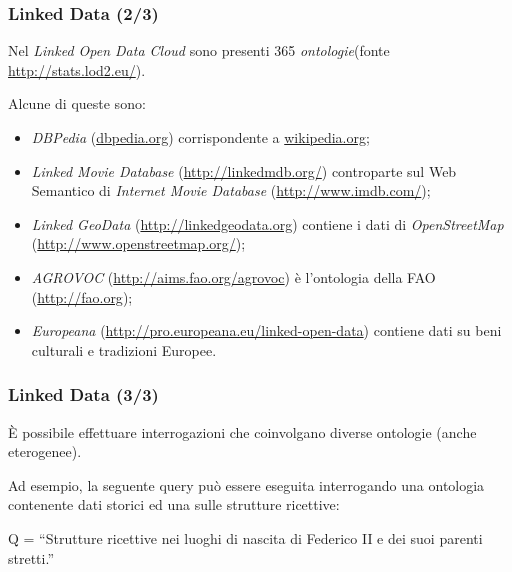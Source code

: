 \documentclass[8pt]{beamer}
\begin{document}
\begin{frame}
\frametitle{Linked Data (2/3)}
Nel \emph{Linked Open Data Cloud} sono presenti 365
\emph{ontologie}(fonte \url{http://stats.lod2.eu/}).
\vspace{\baselineskip}

Alcune di queste sono:
\begin{itemize}
 \item \emph{DBPedia} (\url{dbpedia.org}) corrispondente a \url{wikipedia.org};
 \item \emph{Linked Movie Database} (\url{http://linkedmdb.org/}) controparte sul Web Semantico di \emph{Internet Movie Database} 
 (\url{http://www.imdb.com/});
 \item \emph{Linked GeoData} (\url{http://linkedgeodata.org}) 
  contiene i dati di \emph{OpenStreetMap} (\url{http://www.openstreetmap.org/});
  \item \emph{AGROVOC} (\url{http://aims.fao.org/agrovoc}) \`e l'ontologia della
  FAO (\url{http://fao.org});
  \item \emph{Europeana} (\url{http://pro.europeana.eu/linked-open-data}) contiene dati su beni culturali e tradizioni Europee. 
\end{itemize}
\end{frame}

\begin{frame}
\frametitle{Linked Data (3/3)}
\`E possibile effettuare interrogazioni che coinvolgano diverse
ontologie (anche eterogenee).
\vspace{\baselineskip}

Ad esempio, la seguente query pu\`o essere eseguita
interrogando una ontologia contenente dati storici ed una 
sulle strutture ricettive:


\begin{center}
Q = “Strutture ricettive nei luoghi di nascita di Federico II e dei suoi parenti stretti.”
\end{center}
\end{frame}
\end{document}

